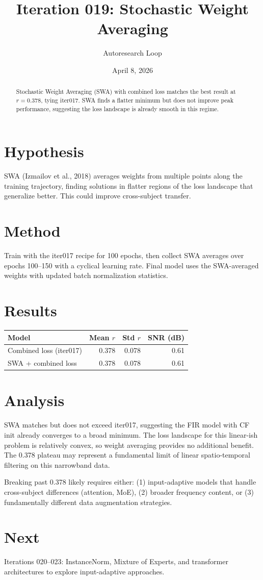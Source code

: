 \documentclass[11pt,a4paper]{article}
\title{Iteration 019: Stochastic Weight Averaging}
\author{Autoresearch Loop}
\date{April 8, 2026}
\begin{document}
\maketitle

\begin{abstract}
Stochastic Weight Averaging (SWA) with combined loss matches the best result
at $r=0.378$, tying iter017. SWA finds a flatter minimum but does not
improve peak performance, suggesting the loss landscape is already smooth
in this regime.
\end{abstract}

\section{Hypothesis}
SWA (Izmailov et al., 2018) averages weights from multiple points along the
training trajectory, finding solutions in flatter regions of the loss landscape
that generalize better. This could improve cross-subject transfer.

\section{Method}
Train with the iter017 recipe for 100 epochs, then collect SWA averages over
epochs 100--150 with a cyclical learning rate. Final model uses the SWA-averaged
weights with updated batch normalization statistics.

\section{Results}
\begin{table}[H]
\centering
\begin{tabular}{lrrr}
\toprule
Model & Mean $r$ & Std $r$ & SNR (dB) \\
\midrule
Combined loss (iter017) & 0.378 & 0.078 & 0.61 \\
SWA + combined loss & 0.378 & 0.078 & 0.61 \\
\bottomrule
\end{tabular}
\end{table}

\section{Analysis}
SWA matches but does not exceed iter017, suggesting the FIR model with CF init
already converges to a broad minimum. The loss landscape for this linear-ish
problem is relatively convex, so weight averaging provides no additional benefit.
The 0.378 plateau may represent a fundamental limit of linear spatio-temporal
filtering on this narrowband data.

Breaking past 0.378 likely requires either: (1) input-adaptive models that handle
cross-subject differences (attention, MoE), (2) broader frequency content, or
(3) fundamentally different data augmentation strategies.

\section{Next}
Iterations 020--023: InstanceNorm, Mixture of Experts, and transformer architectures
to explore input-adaptive approaches.
\end{document}
